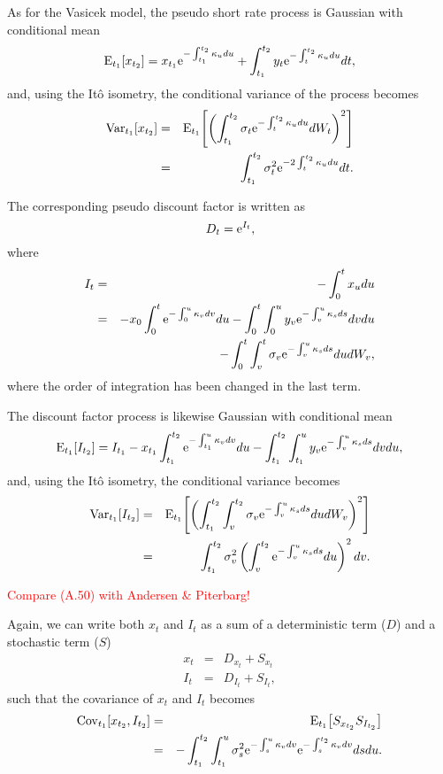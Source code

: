 As for the Vasicek model, the pseudo short rate process is Gaussian with conditional mean
\begin{equation}
\mathrm{E}_{t_1}\! \left[ x_{t_2} \right] = x_{t_1} \text{e}^{-\int_{t_1}^{t_2} \kappa_u du}  + \int_{t_1}^{t_2} y_t \text{e}^{-\int_t^{t_2} \kappa_u du} dt,
\end{equation}
and, using the It\^{o} isometry, the conditional variance of the process becomes
\begin{eqnarray}
\mathrm{Var}_{t_1}\! \left[ x_{t_2} \right] &=& \mathrm{E}_{t_1}\! \left[ \left( \int_{t_1}^{t_2} \sigma_t \text{e}^{-\int_t^{t_2} \kappa_u du} dW_t \right)^2 \right] \\
&=& \int_{t_1}^{t_2} \sigma_t^2 \text{e}^{-2\int_t^{t_2} \kappa_u du} dt.
\end{eqnarray}

The corresponding pseudo discount factor is written as
\begin{equation}
D_{t} = \text{e}^{I_t},
\end{equation}
where
\begin{eqnarray}
I_t &=& -\int_0^t x_u du \\
&=& - x_{0} \int_0^t \text{e}^{-\int_{0}^{u} \kappa_v dv} du - \int_0^t\int_{0}^{u} y_v \text{e}^{-\int_v^{u} \kappa_s ds} dv du \\
&& - \int_0^t \int_{v}^{t} \sigma_v \text{e}^{-\int_v^{u} \kappa_s ds} du dW_v,
\end{eqnarray}
where the order of integration has been changed in the last term.

The discount factor process is likewise Gaussian with conditional mean
\begin{equation}
\mathrm{E}_{t_1}\! \left[ I_{t_{2}} \right] = I_{t_1} - x_{t_1} \int_{t_1}^{t_2} \text{e}^{-\int_{t_1}^{u} \kappa_v dv} du - \int_{t_1}^{t_2} \int_{t_1}^{u} y_v \text{e}^{-\int_v^{u} \kappa_s ds} dv du,
\end{equation}
and, using the It\^{o} isometry, the conditional variance becomes
\begin{eqnarray}
\mathrm{Var}_{t_1}\! \left[ I_{t_{2}} \right] &=& \mathrm{E}_{t_1}\! \left[ \left( \int_{t_1}^{t_2} \int_{v}^{t_2} \sigma_v \text{e}^{-\int_v^{u} \kappa_s ds} du dW_v \right)^2 \right] \\
&=& \int_{t_1}^{t_2} \sigma_v^2 \left( \int_{v}^{t_2} \text{e}^{-\int_v^{u} \kappa_s ds} du \right)^2 dv.
\end{eqnarray}

\textcolor{red}{Compare (A.50) with Andersen \& Piterbarg!}

Again, we can write both $x_t$ and $I_t$ as a sum of a deterministic term ($D$) and a stochastic term ($S$)
\begin{eqnarray}
x_t &=& D_{x_t} + S_{x_t} \\
I_t &=& D_{I_t} + S_{I_t},
\end{eqnarray}
such that the covariance of $x_t$ and $I_t$ becomes
\begin{eqnarray}
\mathrm{Cov}_{t_1}\! \left[ x_{t_2}, I_{t_2} \right] &=& \mathrm{E}_{t_1}\! \left[ S_{x_{t_2}} S_{I_{t_2}} \right] \\
&=& - \int_{t_1}^{t_2} \int_{t_1}^u \sigma_s^2 \text{e}^{-\int_s^{u} \kappa_v dv} \text{e}^{-\int_s^{t_2} \kappa_v dv} ds du.
\end{eqnarray}

